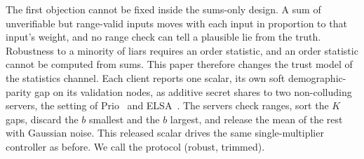 The first objection cannot be fixed inside the sums-only design. A sum of unverifiable but range-valid inputs moves with each input in proportion to that input's weight, and no range check can tell a plausible lie from the truth. Robustness to a minority of liars requires an order statistic, and an order statistic cannot be computed from sums. This paper therefore changes the trust model of the statistics channel. Each client reports one scalar, its own soft demographic-parity gap on its validation nodes, as additive secret shares to two non-colluding servers, the setting of Prio~\citep{corrigangibbs2017prio} and ELSA~\citep{rathee2023elsa}. The servers check ranges, sort the $K$ gaps, discard the $b$ smallest and the $b$ largest, and release the mean of the rest with Gaussian noise. This released scalar drives the same single-multiplier controller as before. We call the protocol \rt{} (robust, trimmed).

